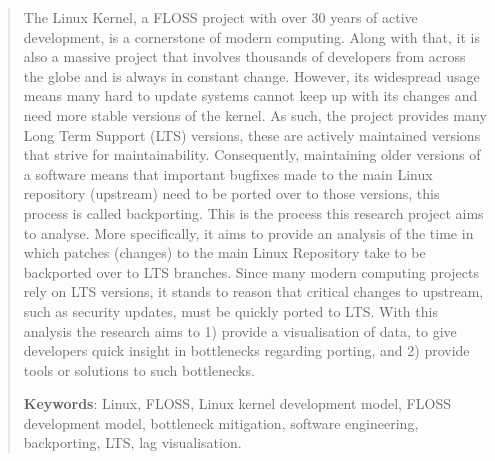 \documentclass[12pt]{article}
\begin{document}
\begin{abstract}
The Linux Kernel, a FLOSS project with over 30 years of active development, is a cornerstone of modern computing. Along with that, it is also a massive project that involves thousands of developers from across the globe and is always in constant change. However, its widespread usage means many hard to update systems cannot keep up with its changes and need more stable versions of the kernel. As such, the project provides many Long Term Support (LTS) versions, these are actively maintained versions that strive for maintainability. Consequently, maintaining older versions of a software means that important bugfixes made to the main Linux repository (upstream) need to be ported over to those versions, this process is called backporting. This is the process this research project aims to analyse. More specifically, it aims to provide an analysis of the time in which patches (changes) to the main Linux Repository take to be backported over to LTS branches. Since many modern computing projects rely on LTS versions, it stands to reason that critical changes to upstream, such as security updates, must be quickly ported to LTS. With this analysis the research aims to 1) provide a visualisation of data, to give developers quick insight in bottlenecks regarding porting, and 2) provide tools or solutions to such bottlenecks. 

\textbf{Keywords}: Linux, FLOSS, Linux kernel development model, FLOSS development model, bottleneck mitigation, software engineering, backporting, LTS, lag
visualisation.

\end{abstract}

\vfill








\printbibliography
\end{document}
